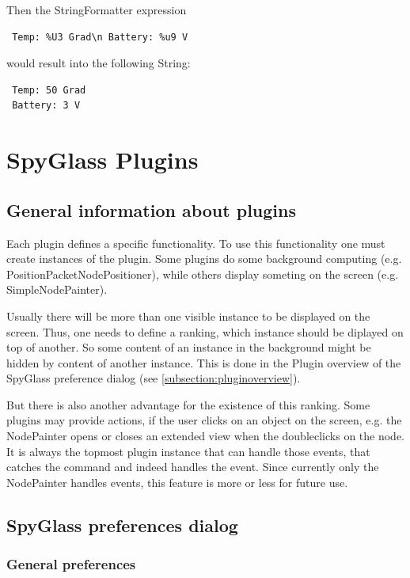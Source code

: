 Then the StringFormatter expression

\begin{verbatim}
 Temp: %U3 Grad\n Battery: %u9 V
\end{verbatim}

would result into the following String:

\begin{verbatim}
 Temp: 50 Grad
 Battery: 3 V
\end{verbatim}

\newpage
\section{SpyGlass Plugins}
\label{section:plugins}

\subsection{General information about plugins}

Each plugin defines a specific functionality. To use this functionality one must create instances of the plugin. 
Some plugins do some background computing (e.g. PositionPacketNodePositioner), while others display someting
on the screen (e.g. SimpleNodePainter).

Usually there will be more than one visible instance to be displayed on the screen. Thus, one needs to define a ranking,
which instance should be diplayed on top of another. So some content of an instance in the background might be hidden
by content of another instance. This is done in the 
Plugin overview of the SpyGlass preference dialog (see \ref{subsection:pluginoverview}).

But there is also another advantage for the existence of this ranking. Some plugins may provide actions, if the user
clicks on an object on the screen, e.g. the NodePainter opens or closes an extended view when the doubleclicks on
the node. It is always the topmost plugin instance that can handle those events, that catches the command and indeed
handles the event. Since currently only the NodePainter handles events, this feature is more or less for
future use.

\subsection{SpyGlass preferences dialog}

\subsubsection{General preferences}
\label{section:generalpreferences}

